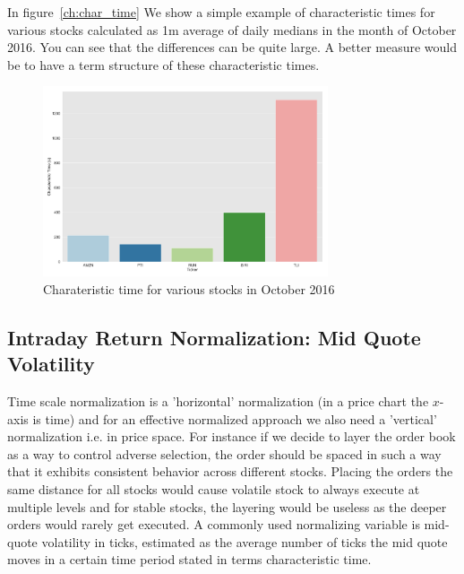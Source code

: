In figure~\ref{ch:char_time} We show a simple example of characteristic times for various stocks calculated as 1m average of daily medians in the month of October 2016. You can see that the differences can be quite large. A better measure would be to have a term structure of these characteristic times.


	\begin{figure}[!ht]
	\centering
	\includegraphics[width=0.75\textwidth]{chapters/chapter_trade_data_models/figures/char_time.png} 
	\caption{Charateristic time for various stocks in October 2016\label{fig:char_time}}
	\end{figure}



\subsection{Intraday Return Normalization: Mid Quote Volatility}

Time scale normalization is a 'horizontal' normalization (in a price chart the $x$-axis is time) and for an effective normalized approach we also need a 'vertical' normalization i.e. in price space. For instance if we decide to layer the order book as a way to control adverse selection, the order should be spaced in such a way that it exhibits consistent behavior across different stocks. Placing the orders the same distance for all stocks would cause volatile stock to always execute at multiple levels and for stable stocks, the layering would be useless as the deeper orders would rarely get executed. A commonly used normalizing variable is mid-quote volatility in ticks, estimated as the average number of ticks the mid quote moves in a certain time period stated in terms characteristic time. 


